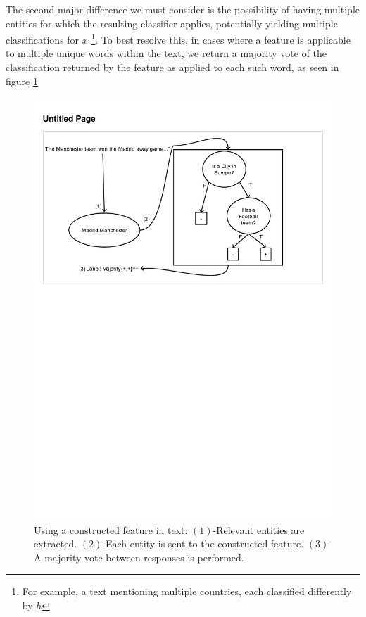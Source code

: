 \documentclass[twoside,11pt]{article}
\theoremstyle{definition}
\begin{document}
The second major difference we must consider is the possibility of having multiple entities for which the resulting classifier applies, potentially yielding multiple classifications for $x$ \footnote{For example, a text mentioning multiple countries, each classified differently by $h$}. To best resolve this, in cases where a feature is applicable to multiple unique words within the text, we return a majority vote of the classification returned by the feature as applied to each such word, as seen in figure \ref{figure5}

\begin{figure}[t]
	\centering
	\includegraphics[width=\linewidth]{fig5.pdf}
	\caption{Using a constructed feature in text: $(1)$-Relevant entities are extracted. $(2)$-Each entity is sent to the constructed feature. $(3)$-A majority vote between responses is performed.}
	\label{figure5}
\end{figure}
\end{document}
